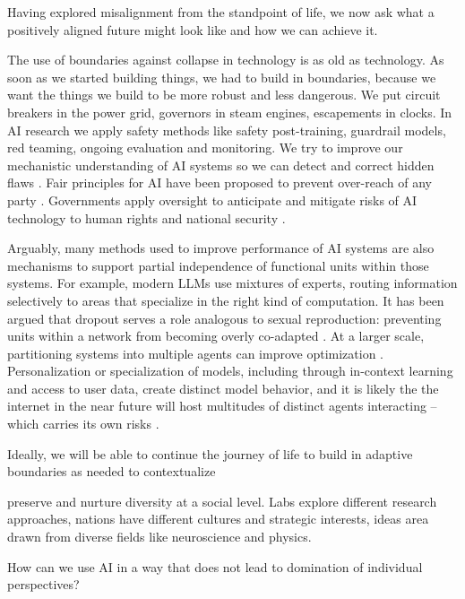 \documentclass[12pt]{article}
\begin{document}
Having explored misalignment from the standpoint of life, we now ask what a positively aligned future might look like and how we can achieve it. 

The use of boundaries against collapse in technology is as old as technology. As soon as we started building things, we had to build in boundaries, because we want the things we build to be more robust and less dangerous. We put circuit breakers in the power grid, governors in steam engines, escapements in clocks. In AI research we apply safety methods like safety post-training, guardrail models, red teaming, ongoing evaluation and monitoring. We try to improve our mechanistic understanding of AI systems so we can detect and correct hidden flaws \citep{olah2020zoom, burns2022discovering, bereska2024mechanistic, anthropic2024mapping}. Fair principles for AI have been proposed to prevent over-reach of any party \citep{gabriel2025matter}. Governments apply oversight to anticipate and mitigate risks of AI technology to human rights and national security \citep{eu2024aiact, uk2023bletchley, us2023eo14110}. 

Arguably, many methods used to improve performance of AI systems are also mechanisms to support partial independence of functional units within those systems. For example, modern LLMs use mixtures of experts, routing information selectively to areas that specialize in the right kind of computation. It has been argued that dropout serves a role analogous to sexual reproduction: preventing units within a network from becoming overly co-adapted \citep{srivastava2014dropout}. At a larger scale, partitioning systems into multiple agents can improve optimization \citep{jaderberg2019human}. Personalization or specialization of models, including through in-context learning and access to user data, create distinct model behavior, and it is likely the the internet in the near future will host multitudes of distinct agents interacting -- which carries its own risks \citep{hammond2025multi}.

Ideally, we will be able to continue the journey of life to build in adaptive boundaries as needed to contextualize 

preserve and nurture diversity at a social level. Labs explore different research approaches, nations have different cultures and strategic interests, ideas area drawn from diverse fields like neuroscience and physics. 

How can we use AI in a way that does not lead to domination of individual perspectives? 
\end{document}
